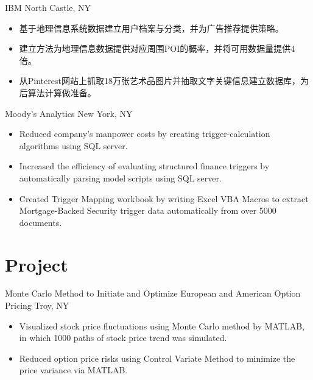 \documentclass[11pt,a4paper,roman]{moderncv} %
\begin{document}
{IBM}
{North Castle, NY}{}
{\begin{itemize}  %
	\item 基于地理信息系统数据建立用户档案与分类，并为广告推荐提供策略。
	\item 建立方法为地理信息数据提供对应周围POI的概率，并将可用数据量提供4倍。
	\item 从Pinterest网站上抓取18万张艺术品图片并抽取文字关键信息建立数据库，为后算法计算做准备。
\end{itemize}}

{Moody's Analytics}
{New York, NY}{}
{\begin{itemize}  %
	\item Reduced company's manpower costs by creating trigger-calculation algorithms using SQL server. %
	\item Increased the efficiency of evaluating structured finance triggers by automatically parsing model scripts using SQL server. %
	\item Created Trigger Mapping workbook by writing Excel VBA Macros to extract Mortgage-Backed Security trigger data automatically from over 5000 documents. %
\end{itemize}}



\section{Project}

{Monte Carlo Method to Initiate and Optimize European and American Option Pricing}
{Troy, NY}{}
{\begin{itemize}  %
    \item Visualized stock price fluctuations using Monte Carlo method by MATLAB, in which 1000 paths of stock price trend was simulated. %
    \item Reduced option price risks using Control Variate Method to minimize the price variance via MATLAB. %
\end{itemize}}
                
\end{document}
